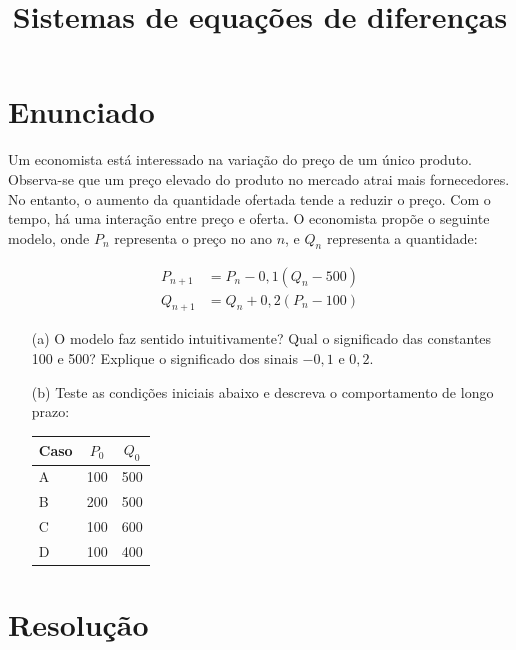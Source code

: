 \documentclass{article}
\begin{document}
\title{Sistemas de equações de diferenças}
\date{}


\maketitle


\section*{Enunciado}

Um economista está interessado na variação do preço de um único produto. Observa-se que um preço elevado do produto no mercado atrai mais fornecedores. No entanto, o aumento da quantidade ofertada tende a reduzir o preço. Com o tempo, há uma interação entre preço e oferta. O economista propõe o seguinte modelo, onde $P_n$ representa o preço no ano $n$, e $Q_n$ representa a quantidade:

\[
\begin{aligned}
P_{n+1} &= P_n - 0{,}1(Q_n - 500) \\
Q_{n+1} &= Q_n + 0{,}2(P_n - 100)
\end{aligned}
\]

\begin{enumerate}
  \item[(a)] O modelo faz sentido intuitivamente? Qual o significado das constantes 100 e 500? Explique o significado dos sinais $-0{,}1$ e $0{,}2$.
  \item[(b)] Teste as condições iniciais abaixo e descreva o comportamento de longo prazo:

  \begin{center}
    \begin{tabular}{lcc}
      \toprule
      \textbf{Caso} & \textbf{$P_0$} & \textbf{$Q_0$} \\
      \midrule
      A & 100 & 500 \\
      B & 200 & 500 \\
      C & 100 & 600 \\
      D & 100 & 400 \\
      \bottomrule
    \end{tabular}
  \end{center}

\end{enumerate}

\section*{Resolução}
\end{document}
